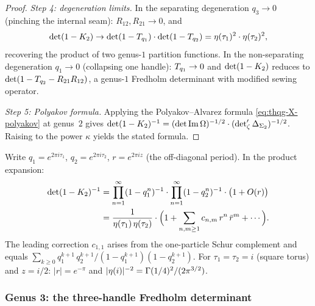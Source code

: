 \begin{proof}
\emph{Step 4: degeneration limits.}
In the separating degeneration $q_3 \to 0$
(pinching the internal seam):
$R_{12}, R_{21} \to 0$, and
\[
\det(1 - K_2) \to
\det(1 - T_{q_1}) \cdot \det(1 - T_{q_2})
= \eta(\tau_1)^2 \cdot \eta(\tau_2)^2,
\]
recovering the product of two genus-$1$ partition functions.
In the non-separating degeneration $q_1 \to 0$
(collapsing one handle):
$T_{q_1} \to 0$ and $\det(1 - K_2)$ reduces to
$\det(1 - T_{q_2} - R_{21}R_{12})$, a genus-$1$
Fredholm determinant with modified sewing operator.

\emph{Step 5: Polyakov formula.}
Applying the Polyakov--Alvarez formula
\eqref{eq:thqg-X-polyakov} at genus~$2$ gives
$\det(1 - K_2)^{-1}
= (\det\operatorname{Im}\Omega)^{-1/2}
\cdot (\det\nolimits'_\zeta\Delta_{\Sigma_2})^{-1/2}$.
Raising to the power $\kappa$ yields the stated formula.
\end{proof}

\begin{computation}%
\label{comp:thqg-X-genus-2-series}%
%
Write $q_1 = e^{2\pi i \tau_1}$, $q_2 = e^{2\pi i \tau_2}$,
$r = e^{2\pi i z}$ (the off-diagonal period).
In the product expansion:
\begin{align}
\det(1 - K_2)^{-1}
&= \prod_{n=1}^{\infty}(1-q_1^n)^{-1}
\cdot \prod_{n=1}^{\infty}(1-q_2^n)^{-1}
\cdot \bigl(1 + O(r)\bigr)
\notag\\
&= \frac{1}{\eta(\tau_1)\,\eta(\tau_2)}
\cdot \Bigl(1 + \sum_{n,m \geq 1}
c_{n,m}\,r^n\,\bar{r}^m + \cdots\Bigr).
\label{eq:thqg-X-genus-2-expansion}
\end{align}
The leading correction $c_{1,1}$ arises from the one-particle
Schur complement and equals
$\sum_{k \geq 0} q_1^{k+1}\,q_2^{k+1}/(1-q_1^{k+1})(1-q_2^{k+1})$.
For $\tau_1 = \tau_2 = i$ (square torus) and $z = i/2$:
$|r| = e^{-\pi}$ and $|\eta(i)|^{-2} = \Gamma(1/4)^2/(2\pi^{3/2})$.
\end{computation}

\subsubsection{Genus 3: the three-handle Fredholm determinant}

